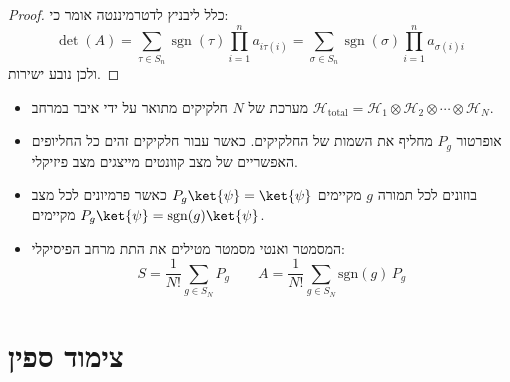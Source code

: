 \documentclass{tstextbook}
\begin{document}
\begin{proof}
כלל ליבניץ לדטרמיננטה אומר כי:
$$\operatorname*{det}(A)=\sum_{\tau\in S_{n}}\operatorname{sgn}(\tau)\prod_{i=1}^{n}a_{i\tau(i)}=\sum_{\sigma\in S_{n}}\operatorname{sgn}(\sigma)\prod_{i=1}^{n}a_{\sigma(i)i}$$
ולכן נובע ישירות.

\end{proof}
\begin{summary}
  \begin{itemize}
    \item מערכת של \(N\) חלקיקים מתואר על ידי איבר במרחב \({\mathcal{H}}_{\mathrm{total}}={\mathcal{H}}_{1}\otimes{\mathcal{H}}_{2}\otimes\cdots\otimes{\mathcal{H}}_{N}\).
    \item אופרטור \(P_{g}\) מחליף את השמות של החלקיקים. כאשר עבור חלקיקים זהים כל החליופים האפשריים של מצב קוונטים מייצגים מצב פיזיקלי.
    \item בוזונים לכל תמורה \(g\) מקיימים \(P_{g}\ket{\psi}=\ket{\psi}\) כאשר פרמיונים לכל מצב מקיימים \(P_{g}\ket{\psi}=\mathrm{sgn}(g)\ket{\psi}\).
    \item המסמטר ואנטי מסמטר מטילים את התת מרחב הפיסיקלי:
$$S={\frac{1}{N!}}\sum_{g\in S_{N}}P_{g}\qquad A=\frac{1}{N!}\sum_{g\in S_{N}}\mathrm{sgn}(g)\,P_{g}$$
  \end{itemize}
\end{summary}
\section{צימוד ספין}
\end{document}
